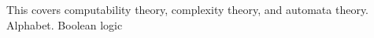 This covers computability theory, complexity theory, and automata theory. 
Alphabet. Boolean logic

